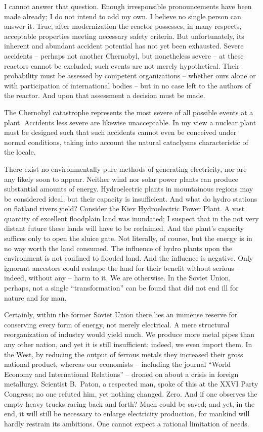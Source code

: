 \documentclass[openright]{bookest}
\begin{document}
I cannot answer that question. Enough irresponsible pronouncements have been made already; I do not intend to add my own. I believe no single person can answer it. True, after modernization the reactor possesses, in many respects, acceptable properties meeting necessary safety criteria. But unfortunately, its inherent and abundant accident potential has not yet been exhausted. Severe accidents -- perhaps not another Chernobyl, but nonetheless severe -- at these reactors cannot be excluded; such events are not merely hypothetical. Their probability must be assessed by competent organizations -- whether ours alone or with participation of international bodies -- but in no case left to the authors of the reactor. And upon that assessment a decision must be made.

The Chernobyl catastrophe represents the most severe of all possible events at a plant. Accidents less severe are likewise unacceptable. In my view a nuclear plant must be designed such that such accidents cannot even be conceived under normal conditions, taking into account the natural cataclysms characteristic of the locale.

There exist no environmentally pure methods of generating electricity, nor are any likely soon to appear. Neither wind nor solar power plants can produce substantial amounts of energy. Hydroelectric plants in mountainous regions may be considered ideal, but their capacity is insufficient. And what do hydro stations on flatland rivers yield? Consider the Kiev Hydroelectric Power Plant. A vast quantity of excellent floodplain land was inundated; I suspect that in the not very distant future these lands will have to be reclaimed. And the plant's capacity suffices only to open the sluice gate. Not literally, of course, but the energy is in no way worth the land consumed. The influence of hydro plants upon the environment is not confined to flooded land. And the influence is negative. Only ignorant ancestors could reshape the land for their benefit without serious -- indeed, without any -- harm to it. We are otherwise. In the Soviet Union, perhaps, not a single ``transformation'' can be found that did not end ill for nature and for man.

Certainly, within the former Soviet Union there lies an immense reserve for conserving every form of energy, not merely electrical. A mere structural reorganization of industry would yield much. We produce more metal pipes than any other nation, and yet it is still insufficient; indeed, we even import them. In the West, by reducing the output of ferrous metals they increased their gross national product, whereas our economists -- including the journal ``World Economy and International Relations'' -- droned on about a crisis in foreign metallurgy. Scientist B.~Paton, a respected man, spoke of this at the XXVI Party Congress; no one refuted him, yet nothing changed. Zero. And if one observes the empty heavy trucks racing back and forth? Much could be saved; and yet, in the end, it will still be necessary to enlarge electricity production, for mankind will hardly restrain its ambitions. One cannot expect a rational limitation of needs.
\end{document}
